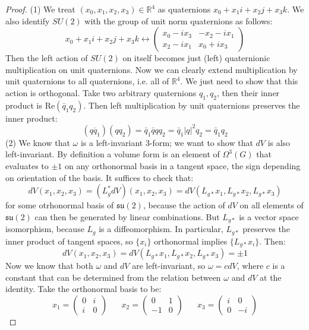 \documentclass[12 pt]{article}
\newcommand{\R}{\mathbb{R}}
\newcommand{\fr}{\mathfrak}
\begin{document}
\begin{proof}
(1) We treat $(x_0, x_1, x_2, x_3) \in \R^4$ as quaternions $x_0 + x_1 i + x_2 j + x_3 k$. We also identify $SU(2)$ with the group of unit norm quaternions as follows:
\[      x_0 + x_1 i + x_2 j + x_3 k  \longleftrightarrow  \left( \begin{array} {cc}  x_0 - i x_3  & -x_2 - i x_1 \\ x_2 - i x_1 & x_0 + i x_3  \end{array} \right)     \]
Then the left action of $SU(2)$ on itself becomes just (left) quaternionic multiplication on unit quaternions. Now we can clearly extend multiplication by unit quaternions to all quaternions, i.e. all of $\R^4$. We just need to show that this action is orthogonal. Take two arbitrary quaternions $q_1, q_2$, then their inner product is Re$(\bar q_1 q_2)$. Then left multiplication by unit quaternions preserves the inner product:
\[         ( \overline{qq_1} ) (qq_2) = \bar q_1 \bar q q q_2 = \bar q_1 |q|^2 q_2 = \bar q_1 q_2       \]
(2) We know that $\omega$ is a left-invariant 3-form; we want to show that $dV$ is also left-invariant. By definition a volume form is an element of $\Omega^3(G)$ that evaluates to $\pm 1$ on any orthonormal basis in a tangent space, the sign depending on orientation of the basis. It suffices to check that:
\[          dV (x_1, x_2, x_3) = (L_g^* dV)(x_1, x_2, x_3)   = dV (L_{g*} x_1, L_{g*} x_2, L_{g*} x_3)      \]
for some otrhonormal basis of $\fr{su}(2)$, because the action of $dV$ on all elements of $\fr{su}(2)$ can then be generated by linear combinations. But $L_{g*}$ is a vector space isomorphism, because $L_g$ is a diffeomorphism. In particular, $L_{g*}$ preserves the inner product of tangent spaces, so $\{x_i\}$ orthonormal implies $\{L_{g*} x_i\}$. Then:
\[     dV (x_1, x_2, x_3) =  dV (L_{g*} x_1, L_{g*} x_2, L_{g*} x_3)  =  \pm 1   \]
Now we know that both $\omega$ and $dV$ are left-invariant, so $\omega = c dV$, where $c$ is a constant that can be determined from the relation between $\omega$ and $dV$ at the identity. Take the orthonormal basis to be:
\[     x_1 = \left(  \begin{array} {cc}  0 & i \\ i & 0  \end{array} \right)   \;\;\;\;\;\;  x_2 = \left(  \begin{array} {cc}  0 & 1 \\ -1 & 0  \end{array} \right)   \;\;\;\;\;\; x_3 = \left(  \begin{array} {cc}  i & 0 \\ 0 & -i  \end{array} \right)    \]

\end{proof}
\end{document}
